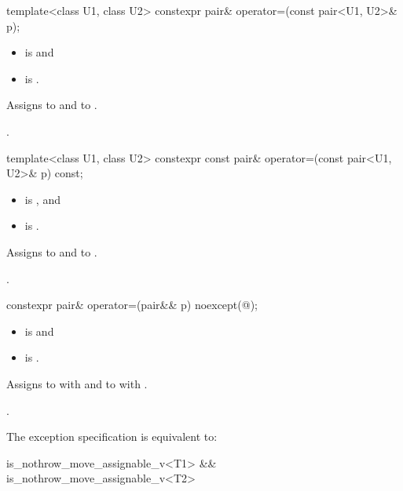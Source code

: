 %
\begin{itemdecl}
template<class U1, class U2> constexpr pair& operator=(const pair<U1, U2>& p);
\end{itemdecl}

\begin{itemdescr}
\pnum
\constraints
\begin{itemize}
\item {} is  and
\item {} is .
\end{itemize}

\pnum
\effects
Assigns  to  and  to .

\pnum
\returns
{}.
\end{itemdescr}

%
\begin{itemdecl}
template<class U1, class U2> constexpr const pair& operator=(const pair<U1, U2>& p) const;
\end{itemdecl}

\begin{itemdescr}
\pnum
\constraints
\begin{itemize}
\item
{} is , and
\item
{} is .
\end{itemize}

\pnum
\effects
Assigns  to  and  to .

\pnum
\returns
{}.
\end{itemdescr}

%
\begin{itemdecl}
constexpr pair& operator=(pair&& p) noexcept(@\seebelow@);
\end{itemdecl}

\begin{itemdescr}
\pnum
\constraints
\begin{itemize}
\item {} is  and
\item {} is .
\end{itemize}

\pnum
\effects
Assigns to  with 
and to  with .

\pnum
\returns
{}.

\pnum
\remarks
The exception specification is equivalent to:
\begin{codeblock}
is_nothrow_move_assignable_v<T1> && is_nothrow_move_assignable_v<T2>
\end{codeblock}
\end{itemdescr}

